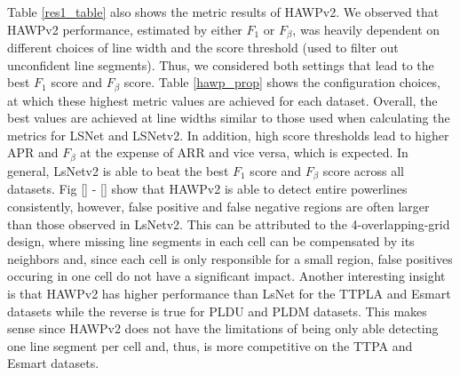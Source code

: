 \documentclass[journal]{IEEEtran}
\begin{document}
Table \ref{res1_table} also shows the metric results of HAWPv2. We observed that HAWPv2 performance, estimated by either $F_1$ or $F_\beta$, was heavily dependent on different choices of line width and the score threshold (used to filter out unconfident line segments). Thus, we considered both settings that lead to the best $F_1$ score and $F_\beta$ score. Table \ref{hawp_prop} shows the configuration choices, at which these highest metric values are achieved for each dataset. Overall, the best values are achieved at line widths similar to those used when calculating the metrics for LSNet and LSNetv2. In addition, high score thresholds lead to higher APR and $F_\beta$ at the expense of ARR and vice versa, which is expected. In general, LsNetv2 is able to beat the best $F_1$ score and $F_\beta$ score across all datasets. Fig \ref{} - \ref{} show that HAWPv2 is able to detect entire powerlines consistently, however, false positive and false negative regions are often larger than those observed in LsNetv2. This can be attributed to the 4-overlapping-grid design, where missing line segments in each cell can be compensated by its neighbors and, since each cell is only responsible for a small region, false positives occuring in one cell do not have a significant impact. Another interesting insight is that HAWPv2 has higher performance than LsNet for the TTPLA and Esmart datasets while the reverse is true for PLDU and PLDM datasets. This makes sense since HAWPv2 does not have the limitations of being only able detecting one line segment per cell and, thus, is more competitive on the TTPA and Esmart datasets.
\end{document}
